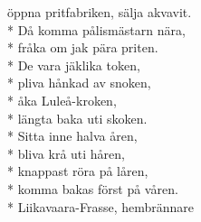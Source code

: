 \begin{SongText}[Gällivarevisan]
\begin{SongVerse}
        öppna pritfabriken, sälja akvavit.\\*%
        Då komma pålismästarn nära,\\*%
        fråka om jak pära priten.\\*%
        De vara jäklika token,\\*%
        pliva hånkad av snoken,\\*%
        åka Luleå-kroken,\\*%
        längta baka uti skoken.\\*%
        Sitta inne halva åren,\\*%
        bliva krå uti håren,\\*%
        knappast röra på låren,\\*%
        komma bakas först på våren.\\*%
        Liikavaara-Frasse, hembrännare
    \end{SongVerse}
\end{SongText}

